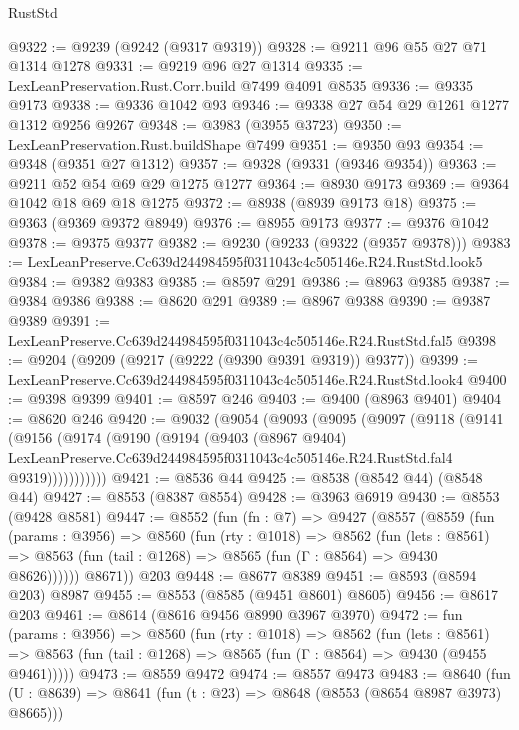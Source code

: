 \begin{lexlean}{RustStd}
\begin{coremodule}
@9322 := @9239 (@9242 (@9317 @9319))
@9328 := @9211 @96 @55 @27 @71 @1314 @1278
@9331 := @9219 @96 @27 @1314
@9335 := LexLeanPreservation.Rust.Corr.build @7499 @4091 @8535
@9336 := @9335 @9173
@9338 := @9336 @1042 @93
@9346 := @9338 @27 @54 @29 @1261 @1277 @1312 @9256 @9267
@9348 := @3983 (@3955 @3723)
@9350 := LexLeanPreservation.Rust.buildShape @7499
@9351 := @9350 @93
@9354 := @9348 (@9351 @27 @1312)
@9357 := @9328 (@9331 (@9346 @9354))
@9363 := @9211 @52 @54 @69 @29 @1275 @1277
@9364 := @8930 @9173
@9369 := @9364 @1042 @18 @69 @18 @1275
@9372 := @8938 (@8939 @9173 @18)
@9375 := @9363 (@9369 @9372 @8949)
@9376 := @8955 @9173
@9377 := @9376 @1042
@9378 := @9375 @9377
@9382 := @9230 (@9233 (@9322 (@9357 @9378)))
@9383 := LexLeanPreserve.Cc639d244984595f0311043c4c505146e.R24.RustStd.look5
@9384 := @9382 @9383
@9385 := @8597 @291
@9386 := @8963 @9385
@9387 := @9384 @9386
@9388 := @8620 @291
@9389 := @8967 @9388
@9390 := @9387 @9389
@9391 := LexLeanPreserve.Cc639d244984595f0311043c4c505146e.R24.RustStd.fal5
@9398 := @9204 (@9209 (@9217 (@9222 (@9390 @9391 @9319)) @9377))
@9399 := LexLeanPreserve.Cc639d244984595f0311043c4c505146e.R24.RustStd.look4
@9400 := @9398 @9399
@9401 := @8597 @246
@9403 := @9400 (@8963 @9401)
@9404 := @8620 @246
@9420 := @9032
    (@9054
      (@9093
        (@9095
          (@9097
            (@9118
              (@9141
                (@9156
                  (@9174
                    (@9190
                      (@9194
                        (@9403
                          (@8967 @9404)
                          LexLeanPreserve.Cc639d244984595f0311043c4c505146e.R24.RustStd.fal4
                          @9319)))))))))))
@9421 := @8536 @44
@9425 := @8538 (@8542 @44) (@8548 @44)
@9427 := @8553 (@8387 @8554)
@9428 := @3963 @6919
@9430 := @8553 (@9428 @8581)
@9447 := @8552
    (fun (fn : @7) =>
    @9427
      (@8557
        (@8559
          (fun (params : @3956) =>
          @8560
            (fun (rty : @1018) =>
            @8562
              (fun (lets : @8561) =>
              @8563 (fun (tail : @1268) => @8565 (fun (Γ : @8564) => @9430 @8626))))))
        @8671))
    @203
@9448 := @8677 @8389
@9451 := @8593 (@8594 @203) @8987
@9455 := @8553 (@8585 (@9451 @8601) @8605)
@9456 := @8617 @203
@9461 := @8614 (@8616 @9456 @8990 @3967 @3970)
@9472 := fun (params : @3956) =>
  @8560
    (fun (rty : @1018) =>
    @8562
      (fun (lets : @8561) =>
      @8563 (fun (tail : @1268) => @8565 (fun (Γ : @8564) => @9430 (@9455 @9461)))))
@9473 := @8559 @9472
@9474 := @8557 @9473
@9483 := @8640 (fun (U : @8639) => @8641 (fun (t : @23) => @8648 (@8553 (@8654 @8987 @3973) @8665)))

\end{coremodule}
\end{lexlean}
